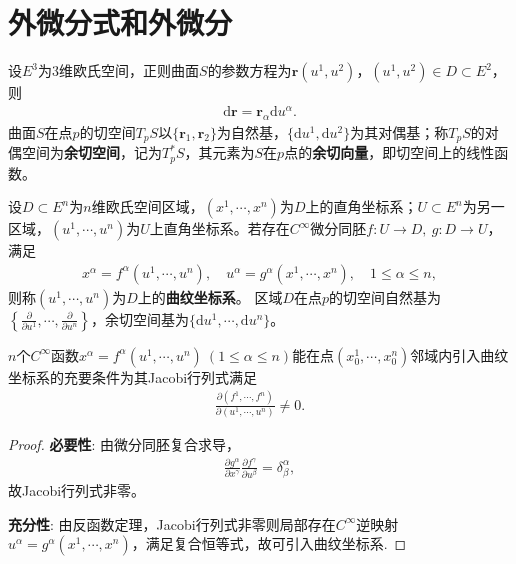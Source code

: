 \documentclass[../../main.tex]{subfiles}%
\begin{document}
\section{外微分式和外微分}

\begin{definition}
设$E^3$为3维欧氏空间，正则曲面$S$的参数方程为$\boldsymbol{r}(u^1,u^2)$，$(u^1,u^2)\in D\subset E^2$，则
\begin{align}
\mathrm{d}\boldsymbol{r}=\boldsymbol{r}_\alpha\mathrm{d}u^\alpha.
\label{eq:dr_surface}
\end{align}
曲面$S$在点$p$的切空间$T_pS$以$\{\boldsymbol{r}_1,\boldsymbol{r}_2\}$为自然基，$\{\mathrm{d}u^1,\mathrm{d}u^2\}$为其对偶基；称$T_pS$的对偶空间为\textbf{余切空间}，记为$T_p^*S$，其元素为$S$在$p$点的\textbf{余切向量}，即切空间上的线性函数。
\end{definition}

\begin{definition}
设$D\subset E^n$为$n$维欧氏空间区域，$(x^1,\cdots,x^n)$为$D$上的直角坐标系；$U\subset E^n$为另一区域，$(u^1,\cdots,u^n)$为$U$上直角坐标系。若存在$C^\infty$微分同胚$f:U\to D,\ g:D\to U$，满足
\begin{align*}
x^\alpha=f^\alpha(u^1,\cdots,u^n),\quad u^\alpha=g^\alpha(x^1,\cdots,x^n),\quad 1\leqslant\alpha\leqslant n,
\end{align*}
则称$(u^1,\cdots,u^n)$为$D$上的\textbf{曲纹坐标系}。
区域$D$在点$p$的切空间自然基为$\left\{\frac{\partial}{\partial u^1},\cdots,\frac{\partial}{\partial u^n}\right\}$，余切空间基为$\{\mathrm{d}u^1,\cdots,\mathrm{d}u^n\}$。
\end{definition}

\begin{proposition}
$n$个$C^\infty$函数$x^\alpha=f^\alpha(u^1,\cdots,u^n)\ (1\leqslant\alpha\leqslant n)$能在点$(x_0^1,\cdots,x_0^n)$邻域内引入曲纹坐标系的充要条件为其Jacobi行列式满足
\begin{align}
\frac{\partial(f^1,\cdots,f^n)}{\partial(u^1,\cdots,u^n)}\neq0.
\label{eq:jacobi_nonzero}
\end{align}
\end{proposition}
\begin{proof}
\textbf{必要性}: 由微分同胚复合求导，
\begin{align*}
\frac{\partial g^\alpha}{\partial x^\gamma}\frac{\partial f^\gamma}{\partial u^\beta}=\delta_\beta^\alpha,
\end{align*}
故Jacobi行列式非零。

\textbf{充分性}: 由反函数定理，Jacobi行列式非零则局部存在$C^\infty$逆映射$u^\alpha=g^\alpha(x^1,\cdots,x^n)$，满足复合恒等式，故可引入曲纹坐标系.
\end{proof}
\end{document}
